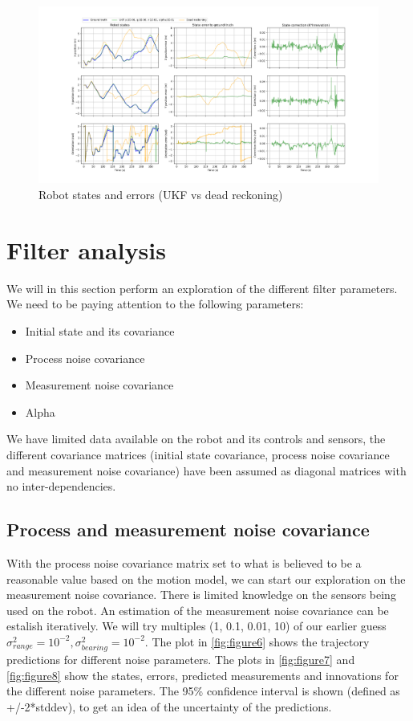 \documentclass{article}
\begin{document}
\begin{figure}
\centering
\includegraphics[width=\textwidth]{Figure_5.png}
\caption{Robot states and errors (UKF vs dead reckoning)}
\end{figure}

\section{Filter analysis}
We will in this section perform an exploration of the different filter parameters. We need to be paying attention to the following parameters:
\begin{itemize}
      \item Initial state and its covariance
      \item Process noise covariance
      \item Measurement noise covariance
      \item Alpha
\end{itemize}

We have limited data available on the robot and its controls and sensors, the different covariance matrices (initial state covariance, process noise covariance and measurement noise covariance) have been assumed as diagonal matrices with no inter-dependencies.


\subsection{Process and measurement noise covariance}
With the process noise covariance matrix set to what is believed to be a reasonable value based on the motion model, we can start our exploration on the measurement noise covariance. There is limited knowledge on the sensors being used on the robot.
An estimation of the measurement noise covariance can be estalish iteratively. We will try multiples (1, 0.1, 0.01, 10) of our earlier guess $\sigma_{range}^2=10^{-2}, \sigma_{bearing}^2=10^{-2}$. The plot in \ref{fig:figure6} shows the trajectory predictions for different noise parameters. The plots in \ref{fig:figure7} and \ref{fig:figure8} show the states, errors, predicted measurements and innovations for the different noise parameters. The 95\% confidence interval is shown (defined as +/-2*stddev), to get an idea of the uncertainty of the predictions.
\end{document}
